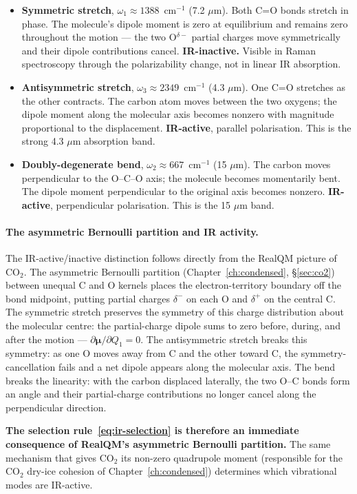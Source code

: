 \begin{itemize}
\item \textbf{Symmetric stretch}, $\omega_1 \approx 1388$~cm$^{-1}$ (7.2 $\mu$m). Both C=O bonds stretch in phase. The molecule's dipole moment is zero at equilibrium and remains zero throughout the motion --- the two O$^{\delta-}$ partial charges move symmetrically and their dipole contributions cancel. \textbf{IR-inactive.} Visible in Raman spectroscopy through the polarizability change, not in linear IR absorption.
\item \textbf{Antisymmetric stretch}, $\omega_3 \approx 2349$~cm$^{-1}$ (4.3 $\mu$m). One C=O stretches as the other contracts. The carbon atom moves between the two oxygens; the dipole moment along the molecular axis becomes nonzero with magnitude proportional to the displacement. \textbf{IR-active}, parallel polarisation. This is the strong 4.3 $\mu$m absorption band.
\item \textbf{Doubly-degenerate bend}, $\omega_2 \approx 667$~cm$^{-1}$ (15 $\mu$m). The carbon moves perpendicular to the O--C--O axis; the molecule becomes momentarily bent. The dipole moment perpendicular to the original axis becomes nonzero. \textbf{IR-active}, perpendicular polarisation. This is the 15 $\mu$m band.
\end{itemize}

\paragraph{The asymmetric Bernoulli partition and IR activity.}
The IR-active/inactive distinction follows directly from the RealQM picture of CO$_2$. The asymmetric Bernoulli partition (Chapter~\ref{ch:condensed}, \S\ref{sec:co2}) between unequal C and O kernels places the electron-territory boundary off the bond midpoint, putting partial charges $\delta^-$ on each O and $\delta^+$ on the central C. The symmetric stretch preserves the symmetry of this charge distribution about the molecular centre: the partial-charge dipole sums to zero before, during, and after the motion --- $\partial\boldsymbol{\mu}/\partial Q_1 = 0$. The antisymmetric stretch breaks this symmetry: as one O moves away from C and the other toward C, the symmetry-cancellation fails and a net dipole appears along the molecular axis. The bend breaks the linearity: with the carbon displaced laterally, the two O--C bonds form an angle and their partial-charge contributions no longer cancel along the perpendicular direction.

\textbf{The selection rule~\eqref{eq:ir-selection} is therefore an immediate consequence of RealQM's asymmetric Bernoulli partition.} The same mechanism that gives CO$_2$ its non-zero quadrupole moment (responsible for the CO$_2$ dry-ice cohesion of Chapter~\ref{ch:condensed}) determines which vibrational modes are IR-active.

